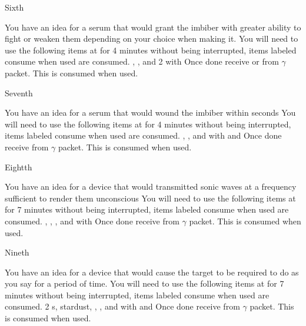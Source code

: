 \documentclass[greennotebook]{guildcamp3} %
\begin{document}
\begin{page}{Sixth}
	
	You have an idea for a serum that would grant the imbiber with greater ability to fight or weaken them depending on your choice when making it.
	You will need to use the following items at \sSciWorkbench{} for 4 minutes without being interrupted, items labeled consume when used are consumed.
	\iCompoundNine{}, \iUnicornHoof{}, and 2 \iScrapMetal{} with \iMultitool{}
	Once done receive \iCRUpSerum{} or \iCRDownSerum{} from $\gamma$ packet. This is consumed when used. 
	
\end{page}

\begin{page}{Seventh}
	
	You have an idea for a serum that would wound the imbiber within seconds
	You will need to use the following items at \sSciWorkbench{} for 4 minutes without being interrupted, items labeled consume when used are consumed.
	\iCompoundNine{}, \iBloodPlasma{}, and \iBelladonna{} with \iCentrifuge{} and \iTestTube{}
	Once done receive \iTechPoison{} from $\gamma$ packet. This is consumed when used. 
	
\end{page}

\begin{page}{Eightth}
	
	You have an idea for a device that would transmitted sonic waves at a frequency sufficient to render them unconscious
	You will need to use the following items at \sSciWorkbench{} for 7 minutes without being interrupted, items labeled consume when used are consumed.
	\iCompoundNine{}, \iOil{}, \iWerewolfFang{}, \iGraphiteLube{} and \iBelladonna{} with \iLeadPipe{}
	Once done receive \iSonicKO{} from $\gamma$ packet. This is consumed when used. 
	
\end{page}

\begin{page}{Nineth}
	
	You have an idea for a device that would cause the target to be required to do as you say for a period of time.
	You will need to use the following items at \sSciWorkbench{} for 7 minutes without being interrupted, items labeled consume when used are consumed.
	2 \iTransistor{}s, stardust, \iCircuitBoard{}, \iCog{}, and \iGraphiteLube{} with \iDiamondDrill{} and \iMonoBlade{}
	Once done receive \iMCDevice{} from $\gamma$ packet. This is consumed when used. 
	
\end{page}
\end{document}
